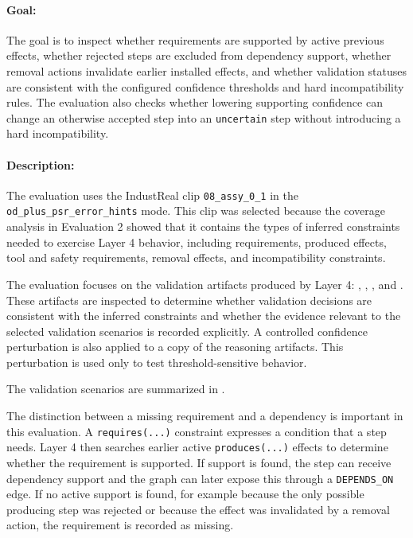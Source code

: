 \paragraph{Goal:}
The goal is to inspect whether requirements are supported by active previous
effects, whether rejected steps are excluded from dependency support, whether
removal actions invalidate earlier installed effects, and whether validation
statuses are consistent with the configured confidence thresholds and hard
incompatibility rules. The evaluation also checks whether lowering supporting
confidence can change an otherwise accepted step into an \texttt{uncertain} step
without introducing a hard incompatibility.

\paragraph{Description:}
The evaluation uses the IndustReal clip \texttt{08\_assy\_0\_1} in the
\texttt{od\_plus\_psr\_error\_hints} mode. This clip was selected because the
coverage analysis in Evaluation 2 showed that it contains the types of inferred
constraints needed to exercise Layer 4 behavior, including requirements, produced
effects, tool and safety requirements, removal effects, and incompatibility
constraints.

The evaluation focuses on the validation artifacts produced by Layer 4:
, ,
, and . These artifacts are inspected to determine whether validation decisions are
consistent with the inferred constraints and whether the evidence relevant to the
selected validation scenarios is recorded explicitly. A controlled confidence perturbation is also applied to a copy of the reasoning artifacts. This perturbation is used only to test threshold-sensitive behavior.

The validation scenarios are summarized in
.

The distinction between a missing requirement and a dependency is important in
this evaluation. A \texttt{requires(...)} constraint expresses a condition that a
step needs. Layer 4 then searches earlier active \texttt{produces(...)} effects to
determine whether the requirement is supported. If support is found, the step can
receive dependency support and the graph can later expose this through a
\texttt{DEPENDS\_ON} edge. If no active support is found, for example because the
only possible producing step was rejected or because the effect was invalidated
by a removal action, the requirement is recorded as missing.


